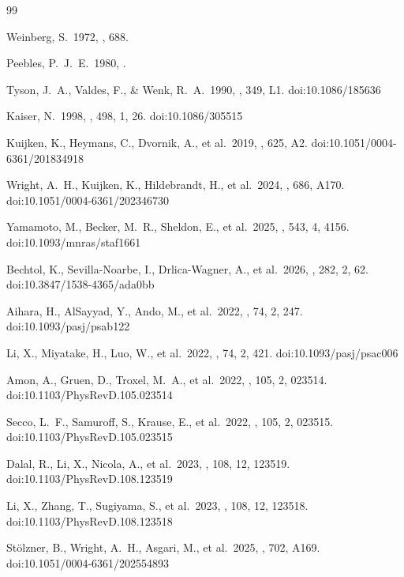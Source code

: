 \documentclass[a4paper, 11pt]{article}
\begin{document}
\begin{thebibliography}{99}

 Weinberg, S.\ 1972, , 688. 

 Peebles, P.~J.~E.\ 1980, . 

 Tyson, J.~A., Valdes, F., \& Wenk, R.~A.\ 1990, \apjl, 349, L1. doi:10.1086/185636

 Kaiser, N.\ 1998, \apj, 498, 1, 26. doi:10.1086/305515

 Kuijken, K., Heymans, C., Dvornik, A., et al.\ 2019, \aap, 625, A2. doi:10.1051/0004-6361/201834918

 Wright, A.~H., Kuijken, K., Hildebrandt, H., et al.\ 2024, \aap, 686, A170. doi:10.1051/0004-6361/202346730

 Yamamoto, M., Becker, M.~R., Sheldon, E., et al.\ 2025, \mnras, 543, 4, 4156. doi:10.1093/mnras/staf1661

 Bechtol, K., Sevilla-Noarbe, I., Drlica-Wagner, A., et al.\ 2026, \apjs, 282, 2, 62. doi:10.3847/1538-4365/ada0bb

 Aihara, H., AlSayyad, Y., Ando, M., et al.\ 2022, \pasj, 74, 2, 247. doi:10.1093/pasj/psab122

 Li, X., Miyatake, H., Luo, W., et al.\ 2022, \pasj, 74, 2, 421. doi:10.1093/pasj/psac006

 Amon, A., Gruen, D., Troxel, M.~A., et al.\ 2022, \prd, 105, 2, 023514. doi:10.1103/PhysRevD.105.023514

 Secco, L.~F., Samuroff, S., Krause, E., et al.\ 2022, \prd, 105, 2, 023515. doi:10.1103/PhysRevD.105.023515

 Dalal, R., Li, X., Nicola, A., et al.\ 2023, \prd, 108, 12, 123519. doi:10.1103/PhysRevD.108.123519

 Li, X., Zhang, T., Sugiyama, S., et al.\ 2023, \prd, 108, 12, 123518. doi:10.1103/PhysRevD.108.123518

 St{\"o}lzner, B., Wright, A.~H., Asgari, M., et al.\ 2025, \aap, 702, A169. doi:10.1051/0004-6361/202554893


\end{thebibliography}
\end{document}
